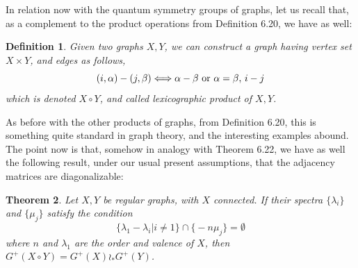 \documentclass[12pt]{amsbook}
\newtheorem{theorem}{Theorem}[chapter]
\newtheorem{definition}[theorem]{Definition}
\begin{document}
In relation now with the quantum symmetry groups of graphs, let us recall that, as a complement to the product operations from Definition 6.20, we have as well:

\begin{definition}
Given two graphs $X,Y$, we can construct a graph having vertex set $X\times Y$, and edges as follows,
$$(i,\alpha)-(j,\beta)\Longleftrightarrow \alpha-\beta\mbox{ \rm{or} }\alpha=\beta,\, i-j$$
which is denoted $X\circ Y$, and called lexicographic product of $X,Y$.
\end{definition}

As before with the other products of graphs, from Definition 6.20, this is something quite standard in graph theory, and the interesting examples abound. The point now is that, somehow in analogy with Theorem 6.22, we have as well the following result, under our usual present assumptions, that the adjacency matrices are diagonalizable:

\begin{theorem}
Let $X,Y$ be regular graphs, with $X$ connected. If their spectra $\{\lambda_i\}$ and $\{\mu_j\}$ satisfy the condition
$$\big\{\lambda_1-\lambda_i\big|i\neq 1\big\}\cap\big\{-n\mu_j\big\}=\emptyset$$
where $n$ and $\lambda_1$ are the order and valence of $X$, then $G^+(X\circ Y)=G^+(X)\wr_*G^+(Y)$.   
\end{theorem}
\end{document}
